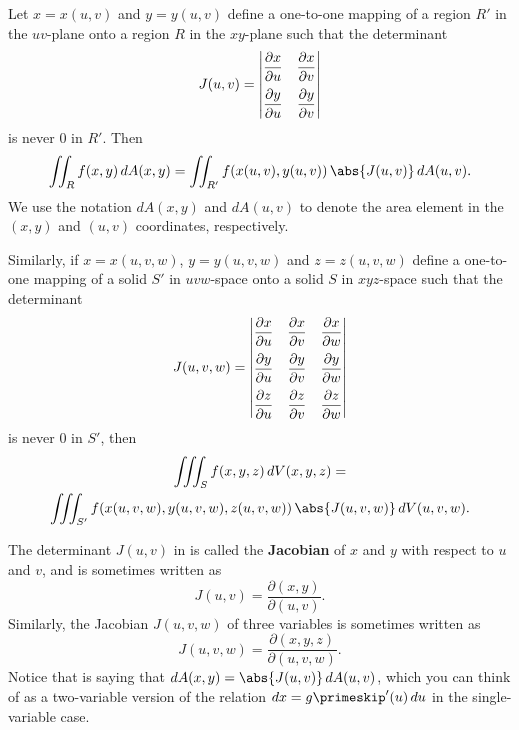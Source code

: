 \begin{theorem}\label{thm:changevarint}
Let $x=x(u,v)$ and $y=y(u,v)$ define a one-to-one mapping of a region $R'$ in the $uv$-plane onto a region $R$ in the $xy$-plane such that the determinant
  \begin{equation}\label{eqn:jacob2}
   J(u,v) =
    \begin{vmatrix}
     \dfrac{\partial x}{\partial u} & \dfrac{\partial x}{\partial v}\vspace{2mm}\\
     \dfrac{\partial y}{\partial u} & \dfrac{\partial y}{\partial v}
    \end{vmatrix}
  \end{equation}
  is never $0$ in $R'$. Then
  \begin{equation}\label{eqn:changevarint2}
   \iint_{R} f(x,y)\,dA(x,y)
   = \iint_{R'} f(x(u,v),y(u,v))\,\abs{J(u,v)}\,dA(u,v) .
  \end{equation}
  We use the notation $dA(x,y)$ and $dA(u,v)$ to denote the area element in the $(x,y)$ and $(u,v)$ coordinates, respectively.
  
  Similarly, if $x=x(u,v,w)$, $y=y(u,v,w)$ and $z=z(u,v,w)$ define a one-to-one mapping of a solid $S'$ in $uvw$-space onto a solid $S$ in $xyz$-space such that the determinant
  \begin{equation}\label{eqn:jacob3}
   J(u,v,w) =
    \begin{vmatrix}
     \dfrac{\partial x}{\partial u} & \dfrac{\partial x}{\partial v} & \dfrac{\partial x}{\partial w}\vspace{2mm}\\
     \dfrac{\partial y}{\partial u} & \dfrac{\partial y}{\partial v} & \dfrac{\partial y}{\partial w}\vspace{2mm}\\
     \dfrac{\partial z}{\partial u} & \dfrac{\partial z}{\partial v} & \dfrac{\partial z}{\partial w}
    \end{vmatrix}
  \end{equation}
  is never $0$ in $S'$, then
  \begin{multline}\label{eqn:changevarint3}
   \iiint_{S} f(x,y,z)\,dV(x,y,z) =\\
   \iiint_{S'} f(x(u,v,w),y(u,v,w),z(u,v,w))\,\abs{J(u,v,w)}\,dV(u,v,w).
  \end{multline}
\end{theorem}

The determinant $J(u,v)$ in  is called the \textbf{Jacobian} of $x$ and $y$ with respect to $u$ and $v$, and is sometimes written as
\[J(u,v) = \frac{\partial (x,y)}{\partial (u,v)} .\]
Similarly, the Jacobian $J(u,v,w)$ of three variables is sometimes written as
\[J(u,v,w) = \frac{\partial (x,y,z)}{\partial (u,v,w)} .\]
Notice that  is saying that $dA(x,y) = \abs{J(u,v)}\,dA(u,v)$, which you can think of as a two-variable version of the relation $dx = g\primeskip'(u)\,du$ in the single-variable case.

